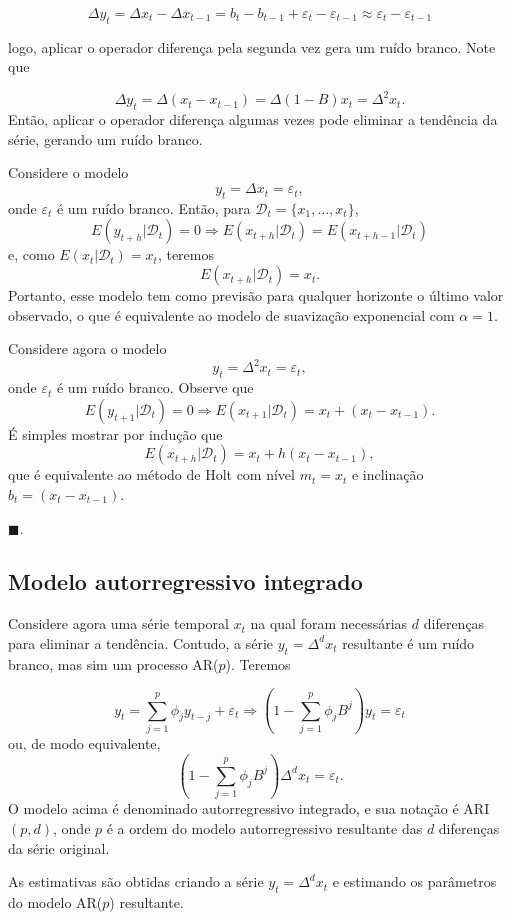 \documentclass[
  letterpaper,
  DIV=11,
  numbers=noendperiod]{scrartcl}
\theoremstyle{definition}
\theoremstyle{definition}
\theoremstyle{plain}
\theoremstyle{plain}
\theoremstyle{remark}
\begin{document}
\[\Delta y_t= \Delta x_t - \Delta x_{t-1}=b_t-b_{t-1}+\varepsilon_t-\varepsilon_{t-1}\approx \varepsilon_t-\varepsilon_{t-1}\]

logo, aplicar o operador diferença pela segunda vez gera um ruído
branco. Note que

\[\Delta y_t=\Delta (x_t-x_{t-1})=\Delta(1-B)x_t=\Delta^2 x_t.\] Então,
aplicar o operador diferença algumas vezes pode eliminar a tendência da
série, gerando um ruído branco.

\protect{}\label{exm}
Considere o modelo \[y_t=\Delta x_t=\varepsilon_t,\] onde
\(\varepsilon_t\) é um ruído branco. Então, para
\(\mathcal{D}_t=\{x_1,\ldots,x_t\}\),
\[E(y_{t+h}|\mathcal{D}_t)=0\Rightarrow E(x_{t+h}|\mathcal{D}_t)=E(x_{t+h-1}|\mathcal{D}_t)\]
e, como \(E(x_t|\mathcal{D}_t)=x_t\), teremos
\[E(x_{t+h}|\mathcal{D}_t)=x_t.\] Portanto, esse modelo tem como
previsão para qualquer horizonte o último valor observado, o que é
equivalente ao modelo de suavização exponencial com \(\alpha=1\).

Considere agora o modelo \[y_t=\Delta^2 x_t=\varepsilon_t,\] onde
\(\varepsilon_t\) é um ruído branco. Observe que
\[E(y_{t+1}|\mathcal{D}_t)=0\Rightarrow E(x_{t+1}|\mathcal{D}_t)=x_t + (x_t-x_{t-1}).\]
É simples mostrar por indução que
\[E(x_{t+h}|\mathcal{D}_t)=x_t+ h(x_t-x_{t-1}),\] que é equivalente ao
método de Holt com nível \(m_t=x_t\) e inclinação \(b_t=(x_t-x_{t-1})\).

\(\blacksquare\).

\subsection{Modelo autorregressivo
integrado}\label{modelo-autorregressivo-integrado}

Considere agora uma série temporal \(x_t\) na qual foram necessárias
\(d\) diferenças para eliminar a tendência. Contudo, a série
\(y_t=\Delta^d x_t\) resultante é um ruído branco, mas sim um processo
AR(\(p\)). Teremos

\[y_t=\sum_{j=1}^p \phi_j y_{t-j}+\varepsilon_t \Rightarrow \left(1-\sum_{j=1}^p \phi_jB^j\right)y_t=\varepsilon_t\]
ou, de modo equivalente,
\[\left(1-\sum_{j=1}^p \phi_jB^j\right)\Delta^d x_t=\varepsilon_t.\] O
modelo acima é denominado autorregressivo integrado, e sua notação é
ARI\((p,d)\), onde \(p\) é a ordem do modelo autorregressivo resultante
das \(d\) diferenças da série original.

As estimativas são obtidas criando a série \(y_t=\Delta^d x_t\) e
estimando os parâmetros do modelo AR(\(p\)) resultante.
\end{document}

